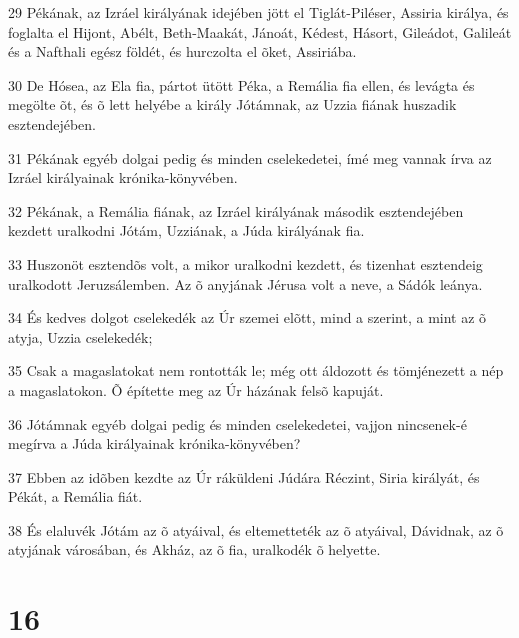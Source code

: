 \par 29 Pékának, az Izráel királyának idejében jött el Tiglát-Piléser, Assiria királya, és foglalta el Hijont, Abélt, Beth-Maakát, Jánoát, Kédest, Hásort, Gileádot, Galileát és a Nafthali egész földét, és hurczolta el õket, Assiriába.
\par 30 De Hósea, az Ela fia, pártot ütött Péka, a Remália fia ellen, és levágta és megölte õt, és õ lett helyébe a király Jótámnak, az Uzzia fiának huszadik esztendejében.
\par 31 Pékának egyéb dolgai pedig és minden cselekedetei, ímé meg vannak írva az Izráel királyainak krónika-könyvében.
\par 32 Pékának, a Remália fiának, az Izráel királyának második esztendejében kezdett uralkodni Jótám, Uzziának, a Júda királyának fia.
\par 33 Huszonöt esztendõs volt, a mikor uralkodni kezdett, és tizenhat esztendeig uralkodott Jeruzsálemben. Az õ anyjának Jérusa volt a neve, a Sádók leánya.
\par 34 És kedves dolgot cselekedék az Úr szemei elõtt, mind a szerint, a mint az õ atyja, Uzzia cselekedék;
\par 35 Csak a magaslatokat nem rontották le; még ott áldozott és tömjénezett a nép a magaslatokon. Õ építette meg az Úr házának felsõ kapuját.
\par 36 Jótámnak egyéb dolgai pedig és minden cselekedetei, vajjon nincsenek-é megírva a Júda királyainak krónika-könyvében?
\par 37 Ebben az idõben kezdte az Úr ráküldeni Júdára Réczint, Siria királyát, és Pékát, a Remália fiát.
\par 38 És elaluvék Jótám az õ atyáival, és eltemetteték az õ atyáival, Dávidnak, az õ atyjának városában, és Akház, az õ fia, uralkodék õ helyette.

\chapter{16}

